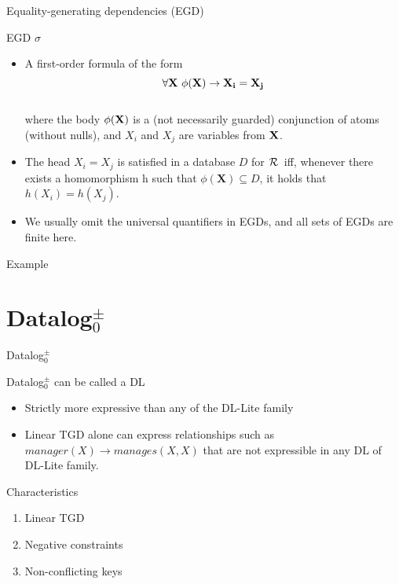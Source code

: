 \documentclass{beamer}
\def\R{\hbox{${\cal{R}}$}}
\begin{document}
 \begin{frame}{Equality-generating dependencies (EGD)}
 
 \begin{block}{EGD $\sigma$}
 \begin{itemize}
\item  A first-order formula of the form\\
 $$\forall \bf{X} ~\phi(\bf{X}) \rightarrow X_i = X_j$$\\
where  the body $\phi(\bf{X})$ is a (not necessarily guarded) conjunction of atoms (without nulls), and $X_i$ and $X_j$ are variables from $\bf{X}$. 

\item The head $X_i = X_j$  is satisfied in a database $D$ for \R\ iff, whenever there exists a homomorphism h such that 
$\phi(\textbf{X}) \subseteq D$, it holds that $h(X_i) = h(X_j)$. 

\item We usually omit the universal quantifiers in EGDs, and all sets of EGDs are finite here.
\end{itemize}
 \end{block}
 \end{frame}
 
 
 
 \begin{frame}{Example}
 
 \end{frame}
 
 
 \section{Datalog$^\pm_0$}
 \begin{frame}{Datalog$^\pm_0$}
 
 \begin{block}{Datalog$^\pm_0$ can be called a DL}
 \begin{itemize}
 \item Strictly more expressive than any of the DL-Lite family
 \item Linear TGD alone can express relationships such as  $ manager (X) \rightarrow manages (X,X)$ that are not expressible in any DL of DL-Lite family.
 \end{itemize}
 \end{block}
 
 \begin{block}{Characteristics}
 \begin{enumerate}
 \item Linear TGD
 \item Negative constraints
 \item Non-conflicting keys
 \end{enumerate}
 
 \end{block}
 
 \end{frame}
 
\end{document}
